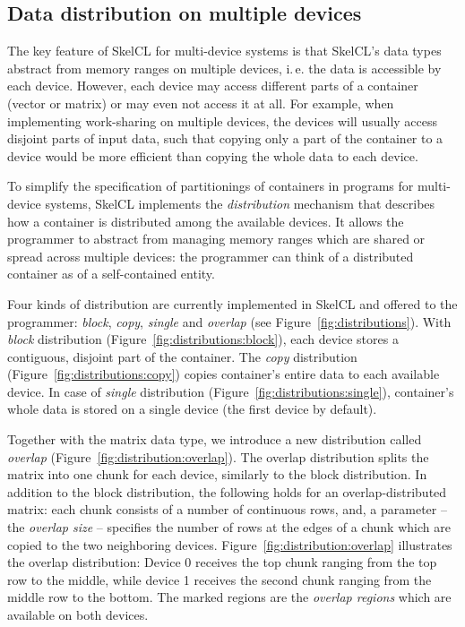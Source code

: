 \subsection{Data distribution on multiple devices}
\label{sec:data_distribution}
The key feature of SkelCL for multi-device systems is that SkelCL's data types abstract from memory ranges on multiple devices, i.\,e. the data is accessible by each device.
However, each device may access different parts of a container (vector or matrix) or may even not access it at all.
For example, when implementing work-sharing on multiple devices, the devices will usually access disjoint parts of input data, such that copying only a part of the container to a device would be more efficient than copying the whole data to each device.

To simplify the specification of partitionings of containers in programs for multi-device systems, SkelCL implements the \emph{distribution} mechanism that describes how a container is distributed among the available devices.
It allows the programmer to abstract from managing memory ranges which are shared or spread across multiple devices:
the programmer can think of a distributed container as of a self-contained entity.

Four kinds of distribution are currently implemented in SkelCL and offered to the programmer:
\emph{block}, \emph{copy}, \emph{single} and \emph{overlap} (see Figure~\ref{fig:distributions}).
With \emph{block} distribution (Figure~\ref{fig:distributions:block}), each device stores a contiguous, disjoint part of the container.
The \emph{copy} distribution (Figure~\ref{fig:distributions:copy}) copies container's entire data to each available device.
In case of \emph{single} distribution (Figure~\ref{fig:distributions:single}), container's whole data is stored on a single device (the first device by default).

Together with the matrix data type, we introduce a new distribution called \emph{overlap} (Figure~\ref{fig:distribution:overlap}).
The overlap distribution splits the matrix into one chunk for each device, similarly to the block distribution.
In addition to the block distribution, the following holds for an overlap-distributed matrix:
each chunk consists of a number of continuous rows, and, a parameter -- the \emph{overlap size} -- specifies the number of rows at the edges of a chunk which are copied to the two neighboring devices.
Figure~\ref{fig:distribution:overlap} illustrates the overlap distribution:
Device 0 receives the top chunk ranging from the top row to the middle, while device 1 receives the second chunk ranging from the middle row to the bottom.
The marked regions are the \emph{overlap regions} which are available on both devices.

